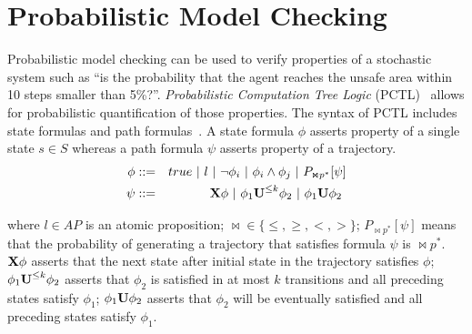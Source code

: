 \section{Probabilistic Model Checking}

Probabilistic model checking can be used to verify properties of a stochastic system such as ``is the probability that the agent reaches the unsafe area within 10 steps smaller than 5\%?''. \emph{Probabilistic Computation Tree Logic} (PCTL)~\cite{Hansson1994} allows for probabilistic quantification of those properties. The syntax of PCTL includes state formulas and path formulas~\cite{kwiatkowska2002prism}. A state formula $\phi$ asserts property of a single state $s\in S$ whereas a path formula $\psi$ asserts property of a trajectory. 
\begin{eqnarray}
\centering
\phi &::=& true\ |\ l\ |\ \neg \phi_i\ |\ \phi_i \land \phi_j\ |\ P_{\Join p^*}[\psi]\label{eq:sec2_statef}\\
\psi &::=& \nextstate\phi\ |\ \phi_1 \until^{\leq k}\phi_2\ |\ \phi_1\until\phi_2\ 
\end{eqnarray}
	
\noindent where $l\in AP$ is an atomic proposition; $\Join\in\{\leq, \geq, <, >\}$; $P_{\Join p^*}[\psi]$ means that the probability of generating a trajectory that satisfies formula $\psi$ is $\Join p^*$. ${\textbf{X}} \phi$ asserts that the next state after initial state in the trajectory satisfies $\phi$; $\phi_1 {\textbf{U}}^{\leq k}\phi_2$ asserts that $\phi_2$ is satisfied in at most $k$ transitions and all preceding states satisfy $\phi_1$; $\phi_1 {\textbf{U}} \phi_2$ asserts that $\phi_2$ will be eventually satisfied and all preceding states satisfy $\phi_1$.


